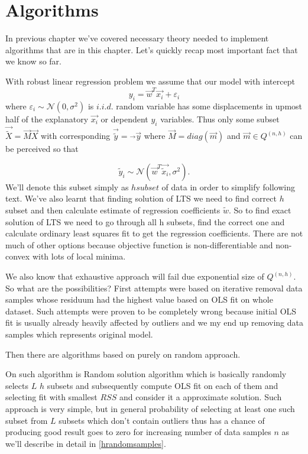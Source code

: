 \chapter{Algorithms}

In previous chapter we've covered necessary theory needed to implement algorithms that are in this chapter. Let's quickly recap most important fact that we know so far.

With robust linear regression problem we assume that our model with intercept
\begin{equation}
		y_i = \vec{w}^T\vec{x_i} + \varepsilon_i
\end{equation}
where $\varepsilon_i \sim \mathcal{N}(0, \sigma^2)$ is $i.i.d.$ random variable has some displacements in upmost half of the explanatory $\vec{x_i}$ or dependent $y_i$ variables. Thus only some subset $\vec{\tilde{X}} = \vec{M}\vec{X}$ with corresponding $\vec{\tilde{y}} = \vec{}\vec{y}$ where $\vec{M} = diag(\vec{m})$ and $\vec{m} \in Q^{(n,h)}$ can be perceived so that 

\begin{equation}
	\tilde{y}_i \sim \mathcal{N}(\vec{w}^T\vec{\tilde{x}_i}, \sigma^2).
\end{equation}
We'll denote this subset simply as $h subset$ of data in order to simplify following text.
We've also learnt that finding solution of LTS we need to find correct $h$ subset and then calculate estimate of regression coefficients $\tilde{w}$. 
So to find exact solution of LTS we need to go through all h subsets, find the correct one and calculate ordinary least squares fit to get the regression coefficients. There are not much of other options because objective function is non-differentiable and non-convex with lots of local minima.  

We also know that exhaustive approach will fail due  exponential size of $Q^{(n,h)}$. So what are the possibilities? First attempts were based on iterative removal data samples whose residuum had the highest value based on OLS fit on whole dataset. Such attempts were proven to be completely wrong because initial OLS fit is usually already  heavily affected by outliers and we my end up removing data samples which represents original model.

Then there are algorithms based on purely on random approach. 

On such algorithm  is Random solution algorithm \cite{bai2003random} which is basically randomly selects $L$ $h$ subsets and subsequently compute OLS fit on each of them and selecting fit with smallest $RSS$ and consider it a approximate solution. Such approach is very simple, but in general probability of selecting at least one such subset from $L$ subsets which don't contain outliers thus has a chance of producing good result goes to zero for increasing number of data samples $n$ as we'll describe in detail in \ref{hrandomsamples}.

